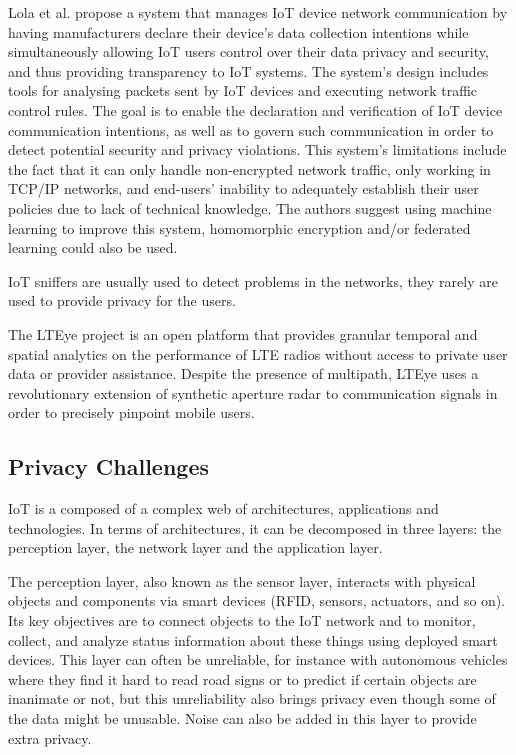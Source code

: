 Lola et al. \cite{electronics12122589} propose a system that manages IoT
device network communication by having manufacturers declare their device's
data collection intentions while simultaneously allowing IoT users control
over their data privacy and security, and thus providing transparency to
IoT systems. The system's design includes tools for analysing packets sent
by IoT devices and executing network traffic control rules. The goal is
to enable the declaration and verification of IoT device communication
intentions, as well as to govern such communication in order to detect
potential security and privacy violations. This system's limitations include
the fact that it can only handle non-encrypted network traffic, only working
in TCP/IP networks, and end-users' inability to adequately establish
their user policies due to lack of technical knowledge. The authors
suggest using machine learning to improve this system, homomorphic encryption
and/or federated learning could also be used.

IoT sniffers are usually used to detect problems in the networks, they rarely
are used to provide privacy for the users.

The LTEye project \cite{KumarLTE} is an open platform that provides granular
temporal and spatial analytics on the performance of LTE radios without access
to private user data or provider assistance. Despite the presence of multipath,
LTEye uses a revolutionary extension of synthetic aperture radar to communication
signals in order to precisely pinpoint mobile users.

\subsection{Privacy Challenges}

IoT is a composed of a complex web of architectures, applications and technologies.
In terms of architectures, it can be decomposed in three layers: the perception
layer, the network layer and the application layer.

The perception layer, also known as the sensor layer, interacts with physical
objects and components via smart devices (RFID, sensors, actuators, and
so on). Its key objectives are to connect objects to the IoT network and
to monitor, collect, and analyze status information about these things using
deployed smart devices. This layer can often be unreliable, for instance
with autonomous vehicles where they find it hard to read road signs or to
predict if certain objects are inanimate or not, but this unreliability
also brings privacy even though some of the data might be unusable. Noise
can also be added in this layer to provide extra privacy.

